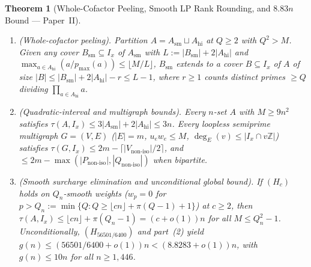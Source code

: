 \documentclass[11pt]{article}
\newtheorem{theorem}{Theorem}
\theoremstyle{remark}
\begin{document}
\begin{theorem}[Whole-Cofactor Peeling, Smooth LP Rank Rounding, and $8.83n$ Bound --- Paper~II]
\leavevmode
\begin{enumerate}
\item \emph{(Whole-cofactor peeling).} Partition $A = A_{\mathrm{sm}} \sqcup A_{\mathrm{hi}}$ at $Q \ge 2$ with $Q^2 > M$. Given any cover $B_{\mathrm{sm}} \subseteq I_x$ of $A_{\mathrm{sm}}$ with $L := |B_{\mathrm{sm}}| + 2|A_{\mathrm{hi}}|$ and $\max_{a \in A_{\mathrm{hi}}} (a / p_{\max}(a)) \le \lfloor M / L \rfloor$, $B_{\mathrm{sm}}$ extends to a cover $B \subseteq I_x$ of $A$ of size $|B| \le |B_{\mathrm{sm}}| + 2|A_{\mathrm{hi}}| - r \le L - 1$, where $r \ge 1$ counts distinct primes $\ge Q$ dividing $\prod_{a \in A_{\mathrm{hi}}} a$.
\item \emph{(Quadratic-interval and multigraph bounds).} Every $n$-set $A$ with $M \ge 9n^2$ satisfies $\tau(A, I_x) \le 3|A_{\mathrm{sm}}| + 2|A_{\mathrm{hi}}| \le 3n$. Every loopless semiprime multigraph $G = (V, E)$ ($|E| = m$, $u_e w_e \le M$, $\deg_E(v) \le |I_x \cap v\mathbb{Z}|$) satisfies $\tau(G, I_x) \le 2m - \lceil |V_{\mathrm{non\text{-}iso}}| / 2 \rceil$, and $\le 2m - \max(|P_{\mathrm{non\text{-}iso}}|, |Q_{\mathrm{non\text{-}iso}}|)$ when bipartite.
\item \emph{(Smooth surcharge elimination and unconditional global bound).} If $(H_c)$ holds on $Q_n$-smooth weights ($w_p = 0$ for $p > Q_n := \min\{Q : Q \ge \lfloor c n \rfloor + \pi(Q - 1) + 1\}$) at $c \ge 2$, then $\tau(A, I_x) \le \lfloor c n \rfloor + \pi(Q_n - 1) = (c + o(1))n$ for all $M \le Q_n^2 - 1$. Unconditionally, $(H_{56501/6400})$ and part~(2) yield $g(n) \le (56501 / 6400 + o(1))n < (8.8283 + o(1))n$, with $g(n) \le 10n$ for all $n \ge 1{,}446$.
\end{enumerate}
\end{theorem}
\end{document}
